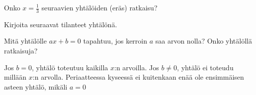\begin{tehtavasivu}
\begin{tehtava}
Onko $x=\frac{1}{3}$ seuraavien yhtälöiden (eräs) ratkaisu?
  \begin{alakohdat}
  \end{alakohdat}

  \begin{vastaus}
    \begin{alakohdat}
    \end{alakohdat}
  \end{vastaus}
\end{tehtava}


\begin{tehtava}
Kirjoita seuraavat tilanteet yhtälönä.
  \begin{alakohdat}
  \end{alakohdat}

  \begin{vastaus}
    \begin{alakohdat}
    \end{alakohdat}
  \end{vastaus}
\end{tehtava}

\begin{tehtava}
Mitä yhtälölle $ax+b = 0$ tapahtuu, jos kerroin $a$ saa arvon nolla? Onko yhtälöllä ratkaisuja?
\begin{vastaus}
Jos $b = 0$, yhtälö toteutuu kaikilla $x$:n arvoilla. Jos $b \neq 0$, yhtälö ei toteudu millään $x$:n arvolla. Periaatteessa kyseessä ei kuitenkaan enää ole ensimmäisen asteen yhtälö, mikäli $a = 0$
\end{vastaus}
\end{tehtava}


\end{tehtavasivu}
